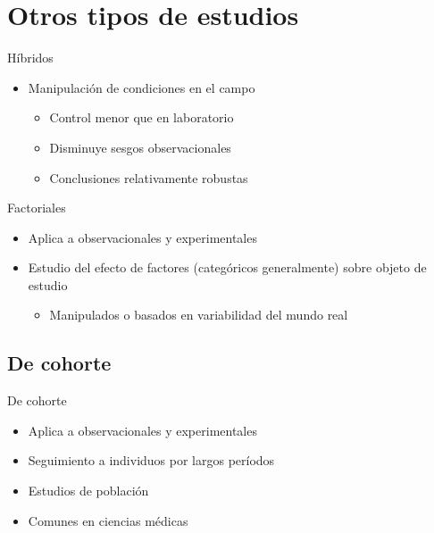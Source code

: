 \documentclass[
  11pt,
  ignorenonframetext,
]{beamer}
\providecommand{\tightlist}{%
  \setlength{\itemsep}{0pt}\setlength{\parskip}{0pt}}
\begin{document}
\hypertarget{otros-tipos-de-estudios}{%
\section{Otros tipos de estudios}\label{otros-tipos-de-estudios}}

\begin{frame}{Híbridos}
\protect\hypertarget{huxedbridos}{}
\begin{itemize}
\item
  Manipulación de condiciones en el campo

  \begin{itemize}
  \item
    Control menor que en laboratorio
  \item
    Disminuye sesgos observacionales
  \item
    Conclusiones relativamente robustas
  \end{itemize}
\end{itemize}
\end{frame}

\begin{frame}{Factoriales}
\protect\hypertarget{factoriales}{}
\begin{itemize}
\item
  Aplica a observacionales y experimentales
\item
  Estudio del efecto de factores (categóricos generalmente) sobre objeto
  de estudio

  \begin{itemize}
  \tightlist
  \item
    Manipulados o basados en variabilidad del mundo real
  \end{itemize}
\end{itemize}
\end{frame}

\hypertarget{de-cohorte}{%
\subsection{De cohorte}\label{de-cohorte}}

\begin{frame}{De cohorte}
\begin{itemize}
\item
  Aplica a observacionales y experimentales
\item
  Seguimiento a individuos por largos períodos
\item
  Estudios de población
\item
  Comunes en ciencias médicas
\end{itemize}
\end{frame}
\end{document}
